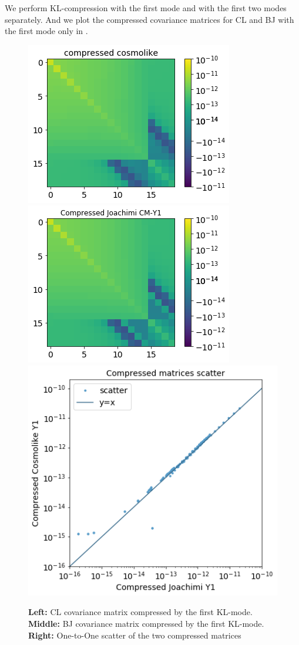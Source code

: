 \documentclass[twocolumn]{\docclass}
\begin{document}
	We perform KL-compression with the first mode and with the first two modes separately. And we plot the compressed covariance matrices for CL and BJ with the first mode only in .
	
	\begin{figure}
		\includegraphics[width=0.68\columnwidth]{kl_comp_cl.png}
		\includegraphics[width=0.68\columnwidth]{kl_comp_bj.png}
		\includegraphics[width=0.54\columnwidth]{kl_scatter.png}
		\caption{\textbf{Left:} CL covariance matrix compressed by the first KL-mode. \textbf{Middle:} BJ covariance matrix compressed by the first KL-mode. \textbf{Right:}  One-to-One scatter of the two compressed matrices \label{fig:comp-cov}}
	\end{figure}
	
\end{document}
